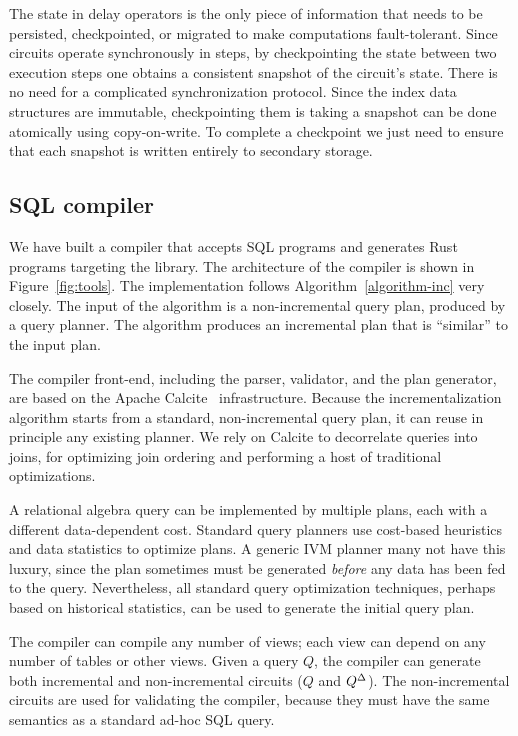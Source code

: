 The state in delay operators is the only piece of information that
needs to be persisted, checkpointed, or migrated to make \dbsp
computations fault-tolerant.  Since \dbsp circuits operate
synchronously in steps, by checkpointing the state between two
execution steps one obtains a consistent snapshot of the circuit's
state.  There is no need for a complicated synchronization protocol.
Since the index data structures are immutable, checkpointing them is
taking a snapshot can be done atomically using copy-on-write.  To
complete a checkpoint we just need to ensure that each snapshot is
written entirely to secondary storage.

\subsection{SQL compiler}

We have built a compiler that accepts SQL programs and generates Rust
programs targeting the \dbsp library.  The architecture of the
compiler is shown in Figure~\ref{fig:tools}.  The implementation
follows Algorithm~\ref{algorithm-inc} very closely.  The input of the
algorithm is a non-incremental query plan, produced by a query
planner.  The algorithm produces an incremental plan that is
``similar'' to the input plan.

The compiler front-end, including the parser, validator, and the plan
generator, are based on the Apache Calcite~\cite{begoli-icmd18}
infrastructure.  Because the incrementalization algorithm starts from
a standard, non-incremental query plan, it can reuse in principle any
existing planner.  We rely on Calcite to decorrelate queries into
joins, for optimizing join ordering and performing a host of
traditional optimizations.

A relational algebra query can be implemented by multiple plans, each
with a different data-dependent cost.  Standard query planners use
cost-based heuristics and data statistics to optimize plans.  A
generic IVM planner many not have this luxury, since the plan
sometimes must be generated \emph{before} any data has been fed to the
query.  Nevertheless, all standard query optimization techniques,
perhaps based on historical statistics, can be used to generate the
initial query plan.

The compiler can compile any number of views; each view can depend on
any number of tables or other views.  Given a query $Q$, the compiler
can generate both incremental and non-incremental circuits ($Q$ and
${Q}^{\Delta}$).  The non-incremental circuits are used for validating the
compiler, because they must have the same semantics as a standard
ad-hoc SQL query.

